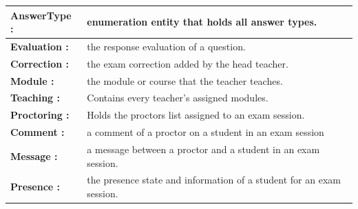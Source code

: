\documentclass[]{uc2pfecaneva}
\begin{document}
\begin{table}
\begin{tabularx}{\textwidth}{|l|X|}
            \textbf{AnswerType :} & enumeration entity that holds all answer types.\\ \hline
            \textbf{Evaluation :} & the response evaluation of a question.\\ \hline
            \textbf{Correction :} & the exam correction added by the head teacher.\\ \hline
            \textbf{Module :} & the module or course that the teacher teaches.\\ \hline
            \textbf{Teaching :} & Contains every teacher's assigned modules.\\ \hline
            \textbf{Proctoring :} & Holds the proctors list assigned to an exam session.\\ \hline
            \textbf{Comment :} & a comment of a proctor on a student in an exam session\\ \hline
            \textbf{Message :} & a message between a proctor and a student in an exam session.\\ \hline
            \textbf{Presence :} & the presence state and information of a student for an exam session.\\ \hline
        \end{tabularx}
        \label{table:1}
    \end{table}

    \clearpage
\end{document}
